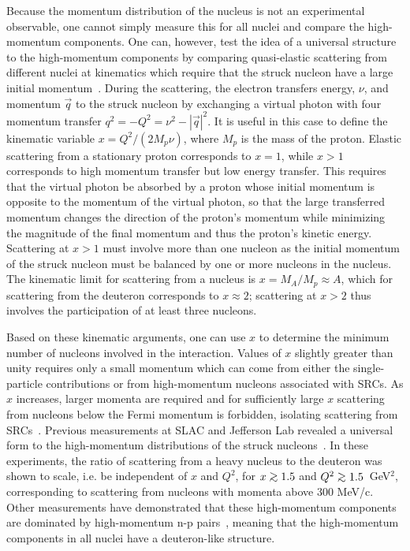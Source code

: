Because the momentum distribution of the nucleus is not an experimental observable, one cannot simply measure this for all nuclei and compare the
high-momentum components. One can, however, test the idea of a universal structure to the high-momentum components by comparing quasi-elastic
scattering from different nuclei at kinematics which require that the struck nucleon have a large initial momentum~\cite{RevModPhys.80.189}.
During the scattering, the electron transfers energy, $\nu$, and momentum $\vec{q}$ to the struck nucleon by exchanging a virtual photon with four
momentum transfer $q^2 = - Q^{2} = \nu^{2}-|\vec{q}|^{2}$. It is useful in this case to define the kinematic variable $x = Q^2/(2M_p\nu)$, where
$M_p$ is the mass of the proton.
%
%
Elastic scattering from a stationary proton corresponds to $x=1$, while $x>1$ corresponds to high momentum transfer but low energy transfer.
This requires that the virtual photon be absorbed by a proton whose initial momentum is opposite to the momentum of the virtual photon, so that
the large transferred momentum changes the direction of the proton's momentum while minimizing the magnitude of the final momentum and thus the
proton's kinetic energy. Scattering at $x>1$ must involve more than one nucleon as the initial momentum of the struck nucleon must be balanced
by one or more nucleons in the nucleus. The kinematic limit for scattering from a nucleus is $x = M_A/M_p \approx A$, which for scattering
from the deuteron corresponds to $x \approx 2$; scattering at $x>2$ thus involves the participation of at least three nucleons.

Based on these kinematic arguments, one can use $x$ to determine the minimum number of nucleons involved in the interaction. Values of $x$ 
slightly greater than unity requires only a small momentum which can come from either the single-particle contributions or from high-momentum
nucleons associated with SRCs. As $x$ increases, larger momenta are required and for sufficiently large $x$ scattering from nucleons below
the Fermi momentum is forbidden, isolating scattering from SRCs~\cite{RevModPhys.80.189, PhysRevC.53.1689}. Previous measurements at SLAC
and Jefferson Lab revealed a universal form to the high-momentum distributions of the struck nucleons~\cite{SLAC_Measurement_PRC.48.2451,
egiyan2003, PhysRevLett.96.082501, fomin2012, src_john}. In these experiments, the ratio of scattering from a heavy nucleus to the deuteron was
shown to scale, i.e. be independent of $x$ and $Q^2$, for $x \gtorder 1.5$ and $Q^2 \gtorder 1.5$~GeV$^2$, corresponding to scattering from
nucleons with momenta above 300 MeV/c. Other measurements have demonstrated that these high-momentum components are dominated by high-momentum n-p
pairs~\cite{Subedi13062008, korover2014, hen14_science}, meaning that the high-momentum components in all nuclei have a deuteron-like structure.

